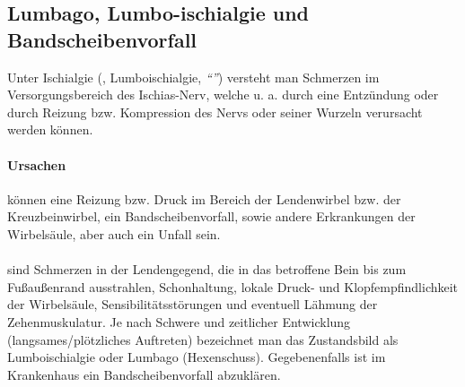 


\subsection{Lumbago, Lumbo-ischialgie und Bandscheibenvorfall} 

Unter Ischialgie (, Lumboischialgie,
\emph{"`"'}) versteht man Schmerzen im
Versorgungsbereich des Ischias-Nerv, welche u. a. durch eine Entzündung oder durch Reizung bzw. Kompression des Nervs oder seiner
Wurzeln verursacht werden können. 

\paragraph{Ursachen} können eine Reizung bzw. Druck
im Bereich der Lendenwirbel bzw. der Kreuzbeinwirbel,
ein Bandscheibenvorfall, sowie andere Erkrankungen der Wirbelsäule, aber auch ein Unfall sein. 

\paragraph{\TxSymptome} sind Schmerzen in der
Lendengegend, die in das betroffene Bein bis zum Fußaußenrand ausstrahlen, 
Schonhaltung, lokale Druck- und Klopfempfindlichkeit der Wirbelsäule,
Sensibilitätsstörungen und eventuell Lähmung der Zehenmuskulatur. Je nach
Schwere und zeitlicher Entwicklung (langsames/plötzliches Auftreten) bezeichnet
man das Zustandsbild als Lumboischialgie oder Lumbago (Hexenschuss). 
Gegebenenfalls ist im Krankenhaus ein Bandscheibenvorfall abzuklären.




